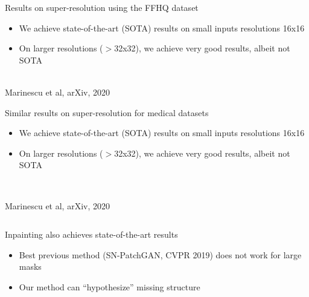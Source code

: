 \begin{frame}{Results on super-resolution using the FFHQ dataset}

\begin{itemize}
 \item We achieve state-of-the-art (SOTA) results on small inputs resolutions 16x16
 \item On larger resolutions ($>$32x32), we achieve very good results, albeit not SOTA
\end{itemize}

\begin{center}
\vo
{}\\
\small{Marinescu et al, arXiv, 2020}
\end{center}
 
\end{frame}

\begin{frame}{Similar results on super-resolution for medical datasets}

\begin{itemize}
 \item We achieve state-of-the-art (SOTA) results on small inputs resolutions 16x16
 \item On larger resolutions ($>$32x32), we achieve very good results, albeit not SOTA
\end{itemize}


\begin{columns}[t]
 \begin{column}{1\textwidth}
 \centering
{}\\
\small{Marinescu et al, arXiv, 2020}\\
 \end{column}
\end{columns}
 
\end{frame}

\begin{frame}{Inpainting also achieves state-of-the-art results}

\begin{itemize}
 \item Best previous method (SN-PatchGAN, CVPR 2019) does not work for large masks
 \item Our method can ``hypothesize'' missing structure
\end{itemize}

\begin{center}
{}
\end{center}
 
\end{frame}


